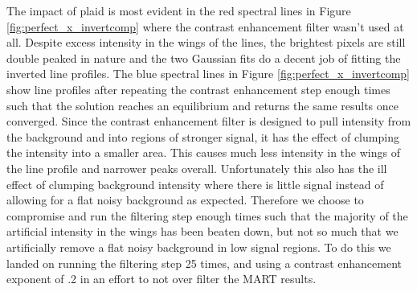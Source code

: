 		

		
		
		The impact of plaid is most evident in the red spectral lines in Figure \ref{fig:perfect_x_invertcomp} where the contrast enhancement filter wasn't used at all.
		Despite excess intensity in the wings of the lines, the brightest pixels are still double peaked in nature and the two Gaussian fits do a decent job of fitting the inverted line profiles.
		The blue spectral lines in Figure \ref{fig:perfect_x_invertcomp} show line profiles after repeating the contrast enhancement step enough times such that the solution reaches an equilibrium and returns the same results once converged.
		Since the contrast enhancement filter is designed to pull intensity from the background and into regions of stronger signal, it has the effect of clumping the intensity into a smaller area.
		This causes much less intensity in the wings of the line profile and narrower peaks overall.  
		Unfortunately this also has the ill effect of clumping background intensity where there is little signal instead of allowing for a flat noisy background as expected.  
		Therefore we choose to compromise and run the filtering step enough times such that the majority of the artificial intensity in the wings has been beaten down, but not so much that we artificially remove a flat noisy background in low signal regions.  
		To do this we landed on running the filtering step 25 times, and using a contrast enhancement exponent of .2 in an effort to not over filter the MART results.
		  

